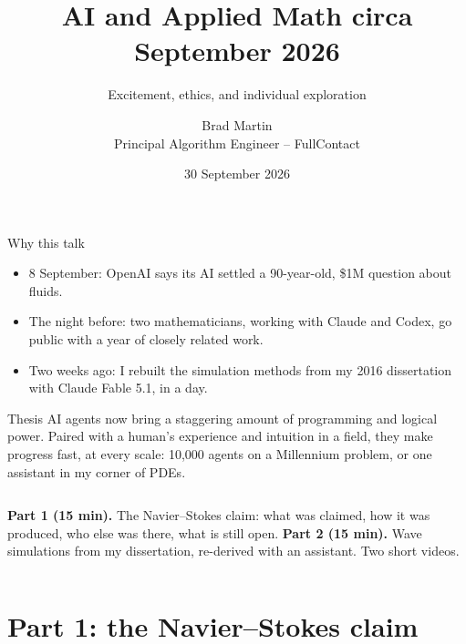 \documentclass[aspectratio=169, 10pt]{beamer}
\title{AI and Applied Math circa September 2026}
\subtitle{Excitement, ethics, and individual exploration}
\author{Brad Martin\\{\small Principal Algorithm Engineer -- FullContact}}
\date{30 September 2026}
\begin{document}
\maketitle

\begin{frame}{Why this talk}
  \begin{itemize}
    \item 8 September: OpenAI says its AI settled a 90-year-old, \$1M question
      about fluids.
    \item The night before: two mathematicians, working with Claude and
      Codex, go public with a year of closely related work.
    \item Two weeks ago: I rebuilt the simulation methods from my 2016
      dissertation with Claude Fable 5.1, in a day.
  \end{itemize}
  \begin{block}{Thesis}
    AI agents now bring a staggering amount of programming and logical power.
    Paired with a human's experience and intuition in a field, they make
    progress fast, at every scale: 10,000 agents on a Millennium problem, or
    one assistant in my corner of PDEs.
  \end{block}
  \begin{columns}[t]
      \textbf{Part 1 (15 min).} The Navier--Stokes claim: what was claimed,
      how it was produced, who else was there, what is still open.
      \textbf{Part 2 (15 min).} Wave simulations from my dissertation,
      re-derived with an assistant. Two short videos.
  \end{columns}
\end{frame}

\section{Part 1: the Navier--Stokes claim}
\end{document}
